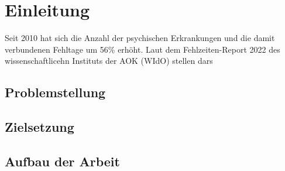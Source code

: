 \section{Einleitung}
Seit 2010 hat sich
die Anzahl der
psychischen
Erkrankungen und
die damit
verbundenen
Fehltage um 56\%
erhöht. Laut dem
Fehlzeiten-Report
2022 des
wissenschaftlicehn
Instituts der AOK
(WIdO) stellen dars
\subsection{Problemstellung}
\subsection{Zielsetzung}
\subsection{Aufbau der Arbeit}
